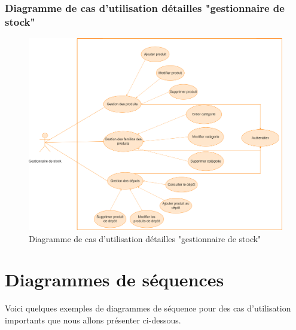 \documentclass[edit,12pt,a4paper,ChapStyle,oneside,doubleinterligne]{report}
\begin{document}
\subsubsection{Diagramme de cas d'utilisation détailles "gestionnaire de stock" }
\begin{figure}[h!]\label{fig:diagramme de cas d'utilisation détailles "Gestionnaire de stock"}
\centering
\includegraphics[width=1\textwidth]{images/usecas GS.png}
\caption{Diagramme de cas d'utilisation détailles "gestionnaire de stock"}
\end{figure}\clearpage


\section{Diagrammes de séquences}
Voici quelques exemples de diagrammes de séquence pour des cas d'utilisation importants que nous allons présenter ci-dessous.
\end{document}

